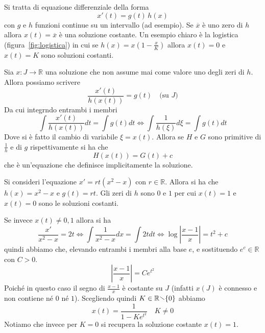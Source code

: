 \begin{example}
    Si tratta di equazione differenziale della forma
    \[
        x'(t) = g(t) \, h(x)
    \]
    con \(g\) e \(h\) funzioni continue su un intervallo (ad esempio). Se
    \(\overline{x}\) è uno zero di \(h\) allora \(x(t) = \overline{x}\) è una
    soluzione costante. Un esempio chiaro è la logistica
    (figura~\ref{fig:logistica}) in cui se \(h(x) = x\left( 1- \frac{x}{K}
    \right) \) allora \(x(t) = 0\) e \(x(t) = K\) sono soluzioni costanti.

    Sia \(x: J \to \mathbb{R}\) una soluzione che non assume mai come valore uno
    degli zeri di \(h\). Allora possiamo scrivere
    \[
        \frac{x'(t)}{ h(x(t)) } = g(t) \quad \text{(su \(J\))}
    \]
    Da cui integrndo entrambi i membri
    \[
        \int \frac{x'(t)}{h(x(t))} dt = \int g(t) dt \iff \int \frac{1}{h(\xi)}
        d\xi = \int g(t) dt 
    \] 
    Dove si è fatto il cambio di variabile \(\xi = x(t)\). Allora se \(H\) e
    \(G\) sono primitive di \(\frac{1}{h}\) e di \(g\) rispettivamente si ha che
    \[
        H(x(t)) = G(t) + c
    \]
    che è un'equazione che definisce implicitamente la soluzione.
    \begin{example}
        Si consideri l'equazione \(x' = rt \left( x^2 - x \right) \) con \(r \in
        \mathbb{R}\). Allora si ha che \(h(x) = x^2 - x\) e \(g(t) = rt\).
        Gli zeri di \(h\) sono \(0\) e \(1\) per cui \(x(t) = 1\) e \(x(t) = 0\)
        sono le soluzioni costanti.

        Se invece \(x(t) \neq 0, 1\) allora si ha
        \[
            \frac{x'}{x^2 - x} = 2t \iff \int \frac{1}{x^2 - x} dx = \int 2t dt
            \iff \log \left| \frac{x-1}{x} \right| = t^2 + c
        \]
        quindi abbiamo che, elevando entrambi i membri alla base \(e\), e
        sostituendo \(e^{c} \in \mathbb{R}\) con \(C > 0\).
        \[
            \left|\frac{x-1}{x}\right| = Ce^{t^2}
        \]
        Poiché in questo caso il segno di \(\frac{x-1}{x}\) è costante su \(J\)
        (infatti \(x(J)\) è connesso e non contiene né \(0\) né \(1\)).
        Scegliendo quindi \(K \in \mathbb{R} \sminus \{0\}\) abbiamo
        \[
            x(t) = \frac{1}{1 - Ke^{t^2}} \quad K \neq 0
        \]
        Notiamo che invece per \(K = 0\) si recupera la soluzione costante \(x(t)
        = 1\).
    \end{example}
\end{example}

